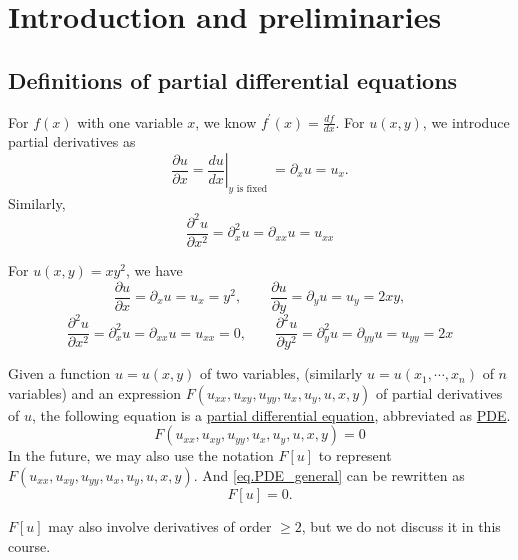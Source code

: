 \section{Introduction and preliminaries}

\subsection{Definitions of partial differential equations}

\begin{definition}
For $f(x)$ with one variable $x$, we know $f^{\prime}(x)=\frac{d f}{d x}$. For $u(x, y)$, we introduce partial derivatives as
\begin{equation}\label{eq.1st_derivatives}
    \frac{\partial u}{\partial x}=\left.\frac{d u}{d x}\right|_{y \text { is fixed }}=\partial_x u=u_x .
\end{equation}
Similarly,
\begin{equation}\label{eq.2nd_derivatives}
    \frac{\partial^2 u}{\partial x^2}=\partial_x^2 u=\partial_{xx} u=u_{x x}
\end{equation}
\end{definition}

\begin{example}[]
For $u(x, y)=x y^2$, we have
\begin{equation*}
\frac{\partial u}{\partial x} = \partial_x u = u_x = y^2, \qquad \frac{\partial u}{\partial y} = \partial_y u = u_y = 2 x y,
\end{equation*}
\begin{equation*}
\frac{\partial^2 u}{\partial x^2}=\partial_x^2 u=\partial_{xx} u=u_{x x}=0, \qquad \frac{\partial^2 u}{\partial y^2}=\partial_y^2 u=\partial_{yy} u=u_{y y}=2 x
\end{equation*}

\end{example}

\begin{definition}
    Given a function $u = u(x, y)$ of two variables, (similarly $u = u(x_1, \cdots, x_n)$ of $n$ variables) and an expression $F(u_{xx}, u_{xy}, u_{yy}, u_{x}, u_{y}, u, x, y)$ of partial derivatives of $u$, the following equation is a \underline{partial differential equation}, abbreviated as \underline{PDE}.
    \begin{equation}\label{eq.PDE_general}
        F(u_{xx}, u_{xy}, u_{yy}, u_{x}, u_{y}, u, x, y) = 0
    \end{equation}
    In the future, we may also use the notation $F[u]$ to represent $F(u_{xx}, u_{xy}, u_{yy}, u_{x}, u_{y}, u, x, y)$. And \eqref{eq.PDE_general} can be rewritten as 
    \begin{equation}\label{eq.PDE_general_short}
        F[u] = 0.
    \end{equation}
\end{definition}
\begin{remark}[]
    $F[u]$ may also involve derivatives of order $\ge 2$, but we do not discuss it in this course.
\end{remark}

